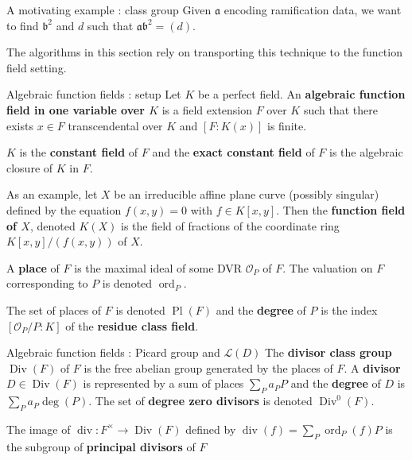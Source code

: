 \documentclass[xcolor=dvipsnames]{beamer}
\theoremstyle{plain}
\DeclareMathOperator{\Div}{Div}
\DeclareMathOperator{\ddiv}{div}
\DeclareMathOperator{\ord}{ord}
\DeclareMathOperator{\Pl}{Pl}
\begin{document}
{\begin{frame}{A motivating example : class group}
      Given $\mathfrak{a}$ encoding ramification data,
      we want to find $\mathfrak{b}^2$ and $d$
      such that $\mathfrak{a}\mathfrak{b}^2=(d)$.
      \pause\par
      The algorithms in this section
      rely on transporting this technique
      to the function field setting.
    \end{frame}
    \begin{frame}{Algebraic function fields : setup}
      Let $K$ be a perfect field.
      An \textbf{algebraic function field in one variable over $K$}
      is a field extension $F$ over $K$ such that there exists
      $x\in F$ transcendental over $K$ and
      $[F:K(x)]$ is finite.
      \pause\par
      $K$ is the \textbf{constant field} of $F$
      and the \textbf{exact constant field} of $F$
      is the algebraic closure of $K$ in $F$.
      \pause\par
      As an example,
      let $X$ be an irreducible affine plane curve
      (possibly singular)
      defined by the equation $f(x,y)=0$
      with $f\in K[x,y]$.
      Then the
      \textbf{function field of $X$},
      denoted $K(X)$ is the field of fractions
      of the coordinate ring $K[x,y]/(f(x,y))$
      of $X$.
      \pause\par
      A \textbf{place} of $F$ is the maximal ideal
      of some DVR
      $\mathcal{O}_P$ of $F$.
      The valuation on $F$ corresponding to $P$ is
      denoted $\ord_P$.
      \pause\par
      The set of places of $F$ is denoted
      $\Pl(F)$ and the \textbf{degree}
      of $P$ is the index
      $[\mathcal{O}_P/P:K]$ of the
      \textbf{residue class field}.
    \end{frame}
    \begin{frame}{Algebraic function fields : Picard group and $\mathscr{L}(D)$}
      The \textbf{divisor class group}
      $\Div(F)$ of $F$ is the free abelian group
      generated by the places of $F$.
      A \textbf{divisor} $D\in\Div(F)$ is represented by
      a sum of places $\sum_{P}a_PP$
      and the \textbf{degree}
      of $D$ is $\sum_{P}a_P\deg(P)$.
      \newline
      The set of \textbf{degree zero divisors} is denoted
      $\Div^0(F)$.
      \pause\par
      The image of $\ddiv\colon F^\times\to\Div(F)$ defined by
      $
        \ddiv(f) = \sum_{P}\ord_P(f)P
      $
      is the subgroup of
      \textbf{principal divisors} of $F$

\end{frame}}
\end{document}
